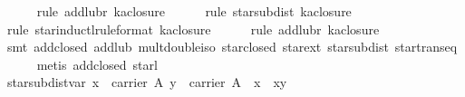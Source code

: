 \begin{isabellebody}
\ \ \ \ \isamarkupfalse%
\ {}rule\ add{}lub{}r{}{}\ ka{}closure{}{}\isanewline
\ \ \ \ \isamarkupfalse%
\ {}rule\ star{}subdist{}\ ka{}closure{}{}\isanewline
\ \ \ \ \isamarkupfalse%
\ {}rule\ star{}inductl{}rule{}format{}{}\ ka{}closure{}{}\isanewline
\ \ \ \ \isamarkupfalse%
\ {}rule\ add{}lub{}r{}{}\ ka{}closure{}{}\isanewline
\ \ \ \ \isamarkupfalse%
\ {}smt\ add{}closed\ add{}lub\ mult{}double{}iso\ star{}closed\ star{}ext\ star{}subdist\ star{}trans{}eq{}\isanewline
\ \ \ \ \isamarkupfalse%
\ {}metis\ add{}closed\ star{}{}l{}%
\endisatagproof
{\isafoldproof}%
%
\isadelimproof
\isanewline
%
\endisadelimproof
\isanewline
\ \ \isamarkupfalse%
\ star{}subdist{}var{}{}{}\ {}{}x\ {}\ carrier\ A{}\ y\ {}\ carrier\ A{}\ {}\ x\ {}\ {}x{}y{}\isanewline

\end{isabellebody}
